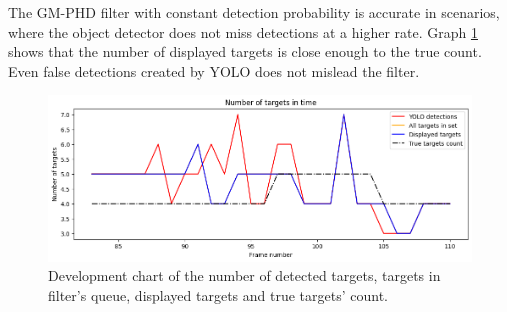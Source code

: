 The GM-PHD filter with constant detection probability is accurate in scenarios, where the object detector does not
miss detections at a higher rate. Graph \ref{gr:E1-V2-S0} shows that the number of displayed targets is close enough
to the true count. Even false detections created by YOLO does not mislead the filter.


\begin{figure}[H]
    \centering
    \includegraphics[width=\linewidth]{../../../experiments/E1/V2/noPd/staticPd_det}
    \caption{Development chart of the number of detected targets, targets in filter's queue, displayed targets and true
    targets' count.}
    \label{gr:E1-V2-S0}
\end{figure}


